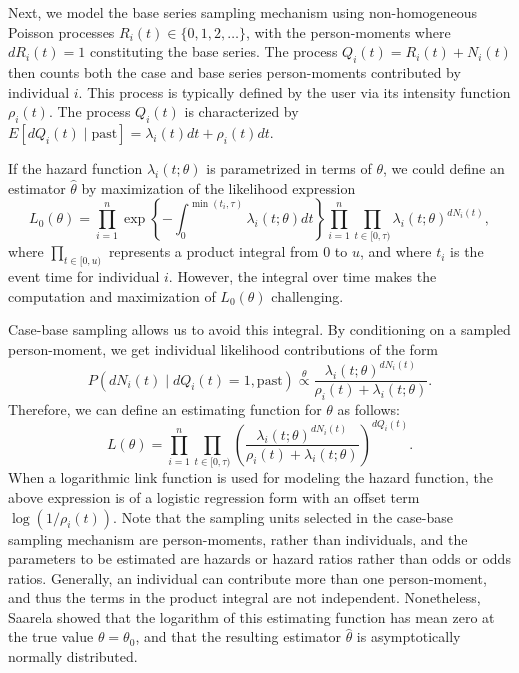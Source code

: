 Next, we model the base series sampling mechanism using non-homogeneous
Poisson processes \(R_i(t) \in \{0, 1, 2, \ldots\}\), with the
person-moments where \(dR_i(t) = 1\) constituting the base series. The
process \(Q_{i}(t) = R_i(t) + N_{i}(t)\) then counts both the case and
base series person-moments contributed by individual \(i\). This process
is typically defined by the user via its intensity function
\(\rho_i(t)\). The process \(Q_{i}(t)\) is characterized by
\(E[dQ_{i}(t)\mid\mathrm{past}] = \lambda_{i}(t)dt + \rho_i(t)dt\).

If the hazard function \(\lambda_{i}(t; \theta)\) is parametrized in
terms of \(\theta\), we could define an estimator \(\hat{\theta}\) by
maximization of the likelihood expression
\[L_0(\theta) = \prod_{i=1}^n \exp\left\{ -\int_0^{\min(t_i,\tau)} \lambda_i(t; \theta) dt \right\} \prod_{i=1}^{n} \prod_{t\in[0,\tau)} \lambda_{i}(t;\theta)^{dN_{i}(t)},\]
where \(\prod_{t\in[0,u)}\) represents a product integral from \(0\) to
\(u\), and where \(t_i\) is the event time for individual \(i\).
However, the integral over time makes the computation and maximization
of \(L_0(\theta)\) challenging.

Case-base sampling allows us to avoid this integral. By conditioning on
a sampled person-moment, we get individual likelihood contributions of
the form
\[P(dN_{i}(t) \mid dQ_{i}(t) = 1,\mathrm{past}) \stackrel{\theta}{\propto} \frac{\lambda_{i}(t; \theta)^{dN_{i}(t)}}{\rho_i(t) + \lambda_{i}(t;\theta)}.\]
Therefore, we can define an estimating function for \(\theta\) as
follows: \begin{equation}
L(\theta) = \prod_{i=1}^{n} \prod_{t\in[0,\tau)} \left(\frac{\lambda_{i}(t; \theta)^{dN_{i}(t)}}{\rho_i(t) + \lambda_{i}(t;\theta)}\right)^{dQ_i(t)}. \label{eq:lik-function}
\end{equation} When a logarithmic link function is used for modeling the
hazard function, the above expression is of a logistic regression form
with an offset term \(\log(1/\rho_i(t))\). Note that the sampling units
selected in the case-base sampling mechanism are person-moments, rather
than individuals, and the parameters to be estimated are hazards or
hazard ratios rather than odds or odds ratios. Generally, an individual
can contribute more than one person-moment, and thus the terms in the
product integral are not independent. Nonetheless, Saarela
\citeyearpar{saarela2016case} showed that the logarithm of this
estimating function has mean zero at the true value \(\theta=\theta_0\),
and that the resulting estimator \(\hat{\theta}\) is asymptotically
normally distributed.

